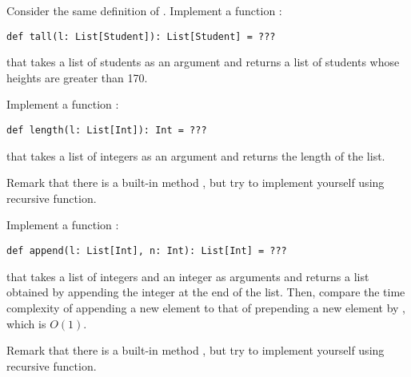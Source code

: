 \begin{exercise}

Consider the same definition of .
Implement a function :
\begin{verbatim}
def tall(l: List[Student]): List[Student] = ???
\end{verbatim}
that takes a list of students as an argument
and returns a list of students whose heights are greater than 170.

\end{exercise}

\begin{exercise}

Implement a function :
\begin{verbatim}
def length(l: List[Int]): Int = ???
\end{verbatim}
that takes a list of integers as an argument
and returns the length of the list.

Remark that there is a built-in method , but try to implement
yourself using recursive function.

\end{exercise}

\begin{exercise}

Implement a function :
\begin{verbatim}
def append(l: List[Int], n: Int): List[Int] = ???
\end{verbatim}
that takes a list of integers and an integer as arguments
and returns a list obtained by appending the integer at the end of the list.
Then, compare the time complexity of appending a new element to that of
prepending a new element by \code{::}, which is $O(1)$.

Remark that there is a built-in method , but try to implement
yourself using recursive function.

\end{exercise}
